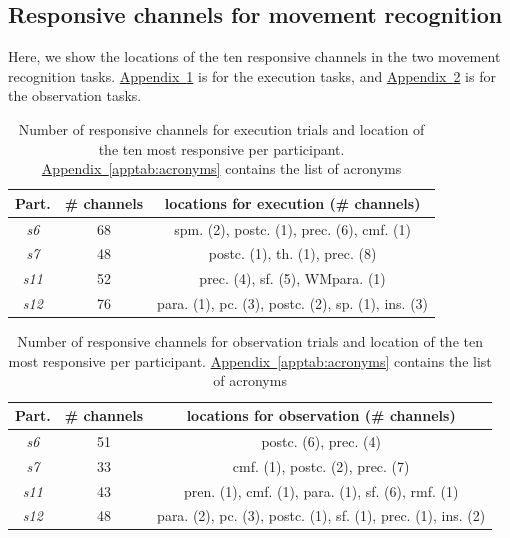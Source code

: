 \documentclass[10pt,conference,compsocconf]{IEEEtran}
\newcommand{\aref}[1]{\hyperref[#1]{Appendix~\ref*{#1}}}
\begin{document}
\subsection{Responsive channels for movement recognition}
Here, we show the locations of the ten responsive channels in the two movement recognition tasks. \aref{apptab:exmovchannellocations} is for the execution tasks, and \aref{apptab:obsmovchannellocations} is for the observation tasks.

\begin{table}[h!]
    \centering
    \begin{tabular}{| c | c | c |}
        \hline
        Part. & \# channels & locations for execution (\# channels) \\
        \hline
        \textit{s6} & 68 & spm. (2), postc. (1), prec. (6), cmf. (1) \\
        \hline
        \textit{s7} & 48 & postc. (1), th. (1), prec. (8)\\
        \hline
        \textit{s11} & 52 & prec. (4), sf. (5), WMpara. (1)\\
        \hline
        \textit{s12} & 76 & para. (1), pc. (3), postc. (2), sp. (1), ins. (3)\\
        \hline
    \end{tabular}
    \caption{Number of responsive channels for execution trials and location of the ten most responsive per participant. \aref{apptab:acronyms} contains the list of acronyms}
    \label{apptab:exmovchannellocations}
\end{table}

\begin{table}[h!]
    \centering
    \begin{tabular}{| c | c | c |}
        \hline
        Part. & \# channels & locations for observation (\# channels) \\
        \hline
        \textit{s6} & 51 & postc. (6), prec. (4)\\
        \hline
        \textit{s7} & 33 & cmf. (1), postc. (2), prec. (7) \\
        \hline
        \textit{s11} & 43 & pren. (1), cmf. (1), para. (1), sf. (6), rmf. (1)\\
        \hline
        \textit{s12} & 48 & para. (2), pc. (3), postc. (1), sf. (1), prec. (1), ins. (2)\\
        \hline
    \end{tabular}
    \caption{Number of responsive channels for observation trials and location of the ten most responsive per participant. \aref{apptab:acronyms} contains the list of acronyms}
    \label{apptab:obsmovchannellocations}
\end{table}
\end{document}
